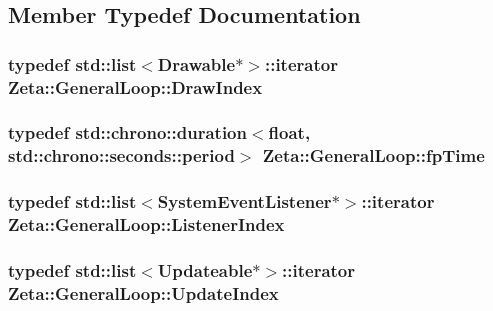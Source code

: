 \subsection{Member Typedef Documentation}
\hypertarget{classZeta_1_1GeneralLoop_a2da478213f010a795485306725782cf4}{
\subsubsection[{Draw\+Index}]{\setlength{\rightskip}{0pt plus 5cm}typedef std\+::list$<${\bf Drawable}$\ast$$>$\+::iterator {\bf Zeta\+::\+General\+Loop\+::\+Draw\+Index}}}\label{classZeta_1_1GeneralLoop_a2da478213f010a795485306725782cf4}
\hypertarget{classZeta_1_1GeneralLoop_a08762f0ffcb03c63096b0da1f5cdf24d}{
\subsubsection[{fp\+Time}]{\setlength{\rightskip}{0pt plus 5cm}typedef std\+::chrono\+::duration$<$float, std\+::chrono\+::seconds\+::period$>$ {\bf Zeta\+::\+General\+Loop\+::fp\+Time}\hspace{0.3cm}{\ttfamily [private]}}}\label{classZeta_1_1GeneralLoop_a08762f0ffcb03c63096b0da1f5cdf24d}
\hypertarget{classZeta_1_1GeneralLoop_a1e3fa8c44577a032a92aca0828310d30}{
\subsubsection[{Listener\+Index}]{\setlength{\rightskip}{0pt plus 5cm}typedef std\+::list$<${\bf System\+Event\+Listener}$\ast$$>$\+::iterator {\bf Zeta\+::\+General\+Loop\+::\+Listener\+Index}}}\label{classZeta_1_1GeneralLoop_a1e3fa8c44577a032a92aca0828310d30}
\hypertarget{classZeta_1_1GeneralLoop_ae1284d366ca644323f019a9e3fcb1b0e}{
\subsubsection[{Update\+Index}]{\setlength{\rightskip}{0pt plus 5cm}typedef std\+::list$<${\bf Updateable}$\ast$$>$\+::iterator {\bf Zeta\+::\+General\+Loop\+::\+Update\+Index}}}\label{classZeta_1_1GeneralLoop_ae1284d366ca644323f019a9e3fcb1b0e}


